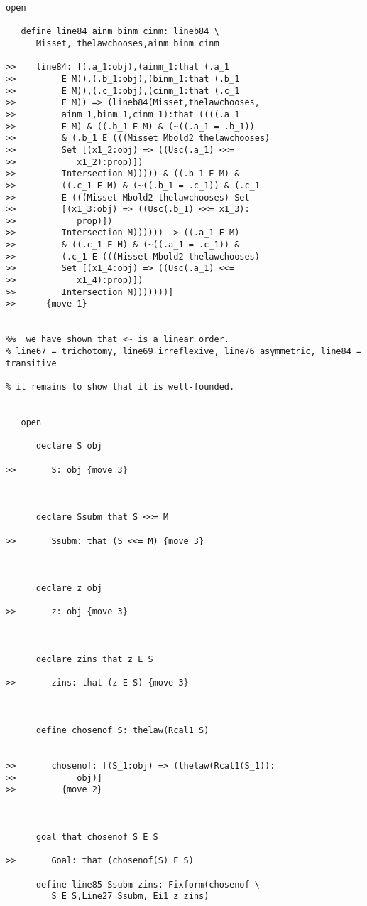 \documentclass[12pt]{article}
\begin{document}
\begin{verbatim}
open

   define line84 ainm binm cinm: lineb84 \
      Misset, thelawchooses,ainm binm cinm

>>    line84: [(.a_1:obj),(ainm_1:that (.a_1
>>         E M)),(.b_1:obj),(binm_1:that (.b_1
>>         E M)),(.c_1:obj),(cinm_1:that (.c_1
>>         E M)) => (lineb84(Misset,thelawchooses,
>>         ainm_1,binm_1,cinm_1):that ((((.a_1
>>         E M) & ((.b_1 E M) & (~((.a_1 = .b_1))
>>         & (.b_1 E (((Misset Mbold2 thelawchooses)
>>         Set [(x1_2:obj) => ((Usc(.a_1) <<=
>>            x1_2):prop)])
>>         Intersection M))))) & ((.b_1 E M) &
>>         ((.c_1 E M) & (~((.b_1 = .c_1)) & (.c_1
>>         E (((Misset Mbold2 thelawchooses) Set
>>         [(x1_3:obj) => ((Usc(.b_1) <<= x1_3):
>>            prop)])
>>         Intersection M)))))) -> ((.a_1 E M)
>>         & ((.c_1 E M) & (~((.a_1 = .c_1)) &
>>         (.c_1 E (((Misset Mbold2 thelawchooses)
>>         Set [(x1_4:obj) => ((Usc(.a_1) <<=
>>            x1_4):prop)])
>>         Intersection M)))))))]
>>      {move 1}


%%  we have shown that <~ is a linear order. 
% line67 = trichotomy, line69 irreflexive, line76 asymmetric, line84 = transitive

% it remains to show that it is well-founded.


   open

      declare S obj

>>       S: obj {move 3}



      declare Ssubm that S <<= M

>>       Ssubm: that (S <<= M) {move 3}



      declare z obj

>>       z: obj {move 3}



      declare zins that z E S

>>       zins: that (z E S) {move 3}



      define chosenof S: thelaw(Rcal1 S)


>>       chosenof: [(S_1:obj) => (thelaw(Rcal1(S_1)):
>>            obj)]
>>         {move 2}



      goal that chosenof S E S

>>       Goal: that (chosenof(S) E S)

      define line85 Ssubm zins: Fixform(chosenof \
         S E S,Line27 Ssubm, Ei1 z zins)


\end{verbatim}
\end{document}
